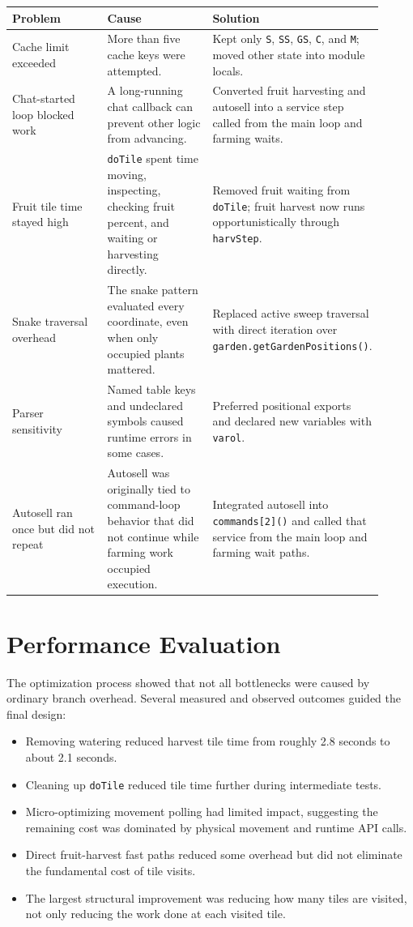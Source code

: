 \documentclass[11pt]{article}
\begin{document}
\begin{longtable}{p{0.29\linewidth} p{0.31\linewidth} p{0.31\linewidth}}
\toprule
Problem & Cause & Solution \\
\midrule
\endhead
Cache limit exceeded & More than five cache keys were attempted. & Kept only \texttt{S}, \texttt{SS}, \texttt{GS}, \texttt{C}, and \texttt{M}; moved other state into module locals. \\
\addlinespace
Chat-started loop blocked work & A long-running chat callback can prevent other logic from advancing. & Converted fruit harvesting and autosell into a service step called from the main loop and farming waits. \\
\addlinespace
Fruit tile time stayed high & \texttt{doTile} spent time moving, inspecting, checking fruit percent, and waiting or harvesting directly. & Removed fruit waiting from \texttt{doTile}; fruit harvest now runs opportunistically through \texttt{harvStep}. \\
\addlinespace
Snake traversal overhead & The snake pattern evaluated every coordinate, even when only occupied plants mattered. & Replaced active sweep traversal with direct iteration over \texttt{garden.getGardenPositions()}. \\
\addlinespace
Parser sensitivity & Named table keys and undeclared symbols caused runtime errors in some cases. & Preferred positional exports and declared new variables with \texttt{varol}. \\
\addlinespace
Autosell ran once but did not repeat & Autosell was originally tied to command-loop behavior that did not continue while farming work occupied execution. & Integrated autosell into \texttt{commands[2]()} and called that service from the main loop and farming wait paths. \\
\bottomrule
\end{longtable}

\section{Performance Evaluation}

The optimization process showed that not all bottlenecks were caused by
ordinary branch overhead. Several measured and observed outcomes guided the
final design:

\begin{itemize}
    \item Removing watering reduced harvest tile time from roughly 2.8 seconds to about 2.1 seconds.
    \item Cleaning up \texttt{doTile} reduced tile time further during intermediate tests.
    \item Micro-optimizing movement polling had limited impact, suggesting the remaining cost was dominated by physical movement and runtime API calls.
    \item Direct fruit-harvest fast paths reduced some overhead but did not eliminate the fundamental cost of tile visits.
    \item The largest structural improvement was reducing how many tiles are visited, not only reducing the work done at each visited tile.
\end{itemize}
\end{document}
